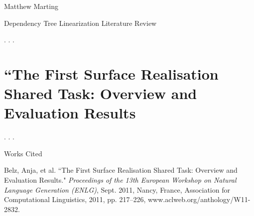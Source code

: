 \documentclass[12pt,letterpaper]{article}
\def \mylastname {Marting}
\def \myname {Matthew \mylastname{}}
\newenvironment{workscited}{
  \newcommand\bibentry{\noindent\hangindent=0.5in}
  \newpage{}
  {\centering Works Cited\par{}}
}{\newpage{}}
\begin{document}
\begin{flushleft}
  \myname{}\\
  {\centering Dependency Tree Linearization Literature Review\par{}}
  \setlength{\parindent}{0.5in}
  . . .
  \section*{``The First Surface Realisation Shared Task: Overview and Evaluation Results}
  . . .
  \begin{workscited}
    \bibentry{}Belz, Anja, et al. ``The First Surface Realisation Shared Task: Overview and Evaluation Results." \textit{Proceedings of the 13th European Workshop on Natural Language Generation (ENLG)}, Sept. 2011, Nancy, France, Association for Computational Linguistics, 2011, pp. 217--226, www.aclweb.org/anthology/W11-2832.
  \end{workscited}
\end{flushleft}
\end{document}
